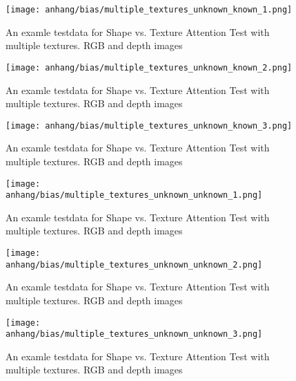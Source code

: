 	\begin{figure}[H]
		\centering
		\texttt{[image: anhang/bias/multiple\_textures\_unknown\_known\_1.png]}
		\caption[An examle testdata for Shape vs. Texture Attention Test with multiple textures. RGB and depth images]{An examle testdata for Shape vs. Texture Attention Test with multiple textures. RGB and depth images}
	\end{figure}
	\begin{figure}[H]
		\centering
		\texttt{[image: anhang/bias/multiple\_textures\_unknown\_known\_2.png]}
		\caption[An examle testdata for Shape vs. Texture Attention Test with multiple textures. RGB and depth images]{An examle testdata for Shape vs. Texture Attention Test with multiple textures. RGB and depth images}
	\end{figure}
	\begin{figure}[H]
		\centering
		\texttt{[image: anhang/bias/multiple\_textures\_unknown\_known\_3.png]}
		\caption[An examle testdata for Shape vs. Texture Attention Test with multiple textures. RGB and depth images]{An examle testdata for Shape vs. Texture Attention Test with multiple textures. RGB and depth images}
	\end{figure}
	
	\begin{figure}[H]
		\centering
		\texttt{[image: anhang/bias/multiple\_textures\_unknown\_unknown\_1.png]}
		\caption[An examle testdata for Shape vs. Texture Attention Test with multiple textures. RGB and depth images]{An examle testdata for Shape vs. Texture Attention Test with multiple textures. RGB and depth images}
	\end{figure}
	\begin{figure}[H]
		\centering
		\texttt{[image: anhang/bias/multiple\_textures\_unknown\_unknown\_2.png]}
		\caption[An examle testdata for Shape vs. Texture Attention Test with multiple textures. RGB and depth images]{An examle testdata for Shape vs. Texture Attention Test with multiple textures. RGB and depth images}
	\end{figure}
	\begin{figure}[H]
		\centering
		\texttt{[image: anhang/bias/multiple\_textures\_unknown\_unknown\_3.png]}
		\caption[An examle testdata for Shape vs. Texture Attention Test with multiple textures. RGB and depth images]{An examle testdata for Shape vs. Texture Attention Test with multiple textures. RGB and depth images}
	\end{figure}
	\fi
	

